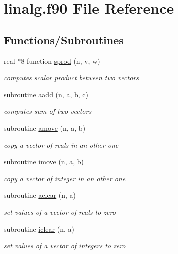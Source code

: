 \hypertarget{linalg_8f90}{\section{linalg.\-f90 File Reference}
\label{linalg_8f90}
}
\subsection*{Functions/\-Subroutines}
\begin{DoxyCompactItemize}
\item 
real $\ast$8 function \hyperlink{linalg_8f90_a4519f3a402e5e646e9cb5d17732df732}{sprod} (n, v, w)
\begin{DoxyCompactList}\small\item\em computes scalar product between two vectors \end{DoxyCompactList}\item 
subroutine \hyperlink{linalg_8f90_a96f21e274b6847b86d4f082dc8d2108c}{aadd} (n, a, b, c)
\begin{DoxyCompactList}\small\item\em computes sum of two vectors \end{DoxyCompactList}\item 
subroutine \hyperlink{linalg_8f90_a92c632765a18053db5815429cf5f3a8f}{amove} (n, a, b)
\begin{DoxyCompactList}\small\item\em copy a vector of reals in an other one \end{DoxyCompactList}\item 
subroutine \hyperlink{linalg_8f90_a5b462546d66226b534cd989ad86df2df}{imove} (n, a, b)
\begin{DoxyCompactList}\small\item\em copy a vector of integer in an other one \end{DoxyCompactList}\item 
subroutine \hyperlink{linalg_8f90_a7551e9b2fc5f88fb6f5e2871dfbf6799}{aclear} (n, a)
\begin{DoxyCompactList}\small\item\em set values of a vector of reals to zero \end{DoxyCompactList}\item 
subroutine \hyperlink{linalg_8f90_a840d05cdbd683364c878625448d5af70}{iclear} (n, a)
\begin{DoxyCompactList}\small\item\em set values of a vector of integers to zero \end{DoxyCompactList}\item 

\end{DoxyCompactItemize}
